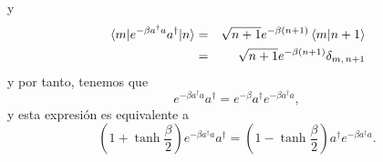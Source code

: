 \documentclass[%
 reprint,
 amsmath,amssymb,
 aps,
 pra,
]{revtex4-2}
\begin{document}
y
\begin{eqnarray}
\mel{m}{e^{-\beta a^\dag a }a^\dag}{n} 	&=& \sqrt{n+1}e^{-\beta (n+1)} \braket{m}{n+1} \nonumber\\
									&=&  \sqrt{n+1}e^{-\beta (n+1)} \delta_{m,\,n+1} \label{eq:mel-4}
\end{eqnarray}
y por tanto, tenemos que
\begin{equation}
e^{-\beta a^\dag a} a^\dag = e^{-\beta} a^\dag e^{-\beta a^\dag a}, 
\end{equation}
y esta expresión es equivalente a 
\begin{equation}
\left(1+\tanh\frac{\beta}{2}\right)e^{-\beta a^\dag a} a^\dag = \left(1-\tanh\frac{\beta}{2}\right) a^\dag e^{-\beta a^\dag a}.\label{eq:relation-adag-times-exp}
\end{equation}
\end{document}
